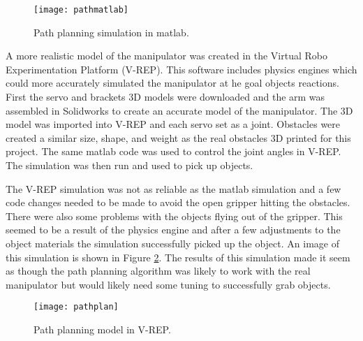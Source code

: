 \begin{figure}[h]
\centering
\texttt{[image: pathmatlab]}
\caption{Path planning simulation in matlab.}
\label{fig:pathmatlab}
\end{figure}

A more realistic model of the manipulator was created in the Virtual Robo Experimentation Platform (V-REP). This software includes physics engines which could more accurately simulated the manipulator at he goal objects reactions. First the servo and brackets 3D models were downloaded and the arm was assembled in Solidworks to create an accurate model of the manipulator. The 3D model was imported into V-REP and each servo set as a joint. Obstacles were created a similar size, shape, and weight as the real obstacles 3D printed for this project. The same matlab code was used to control the joint angles in V-REP. The simulation was then run and used to pick up objects. 

The V-REP simulation was not as reliable as the matlab simulation and a few code changes needed to be made to avoid the open gripper hitting the obstacles. There were also some problems with the objects flying out of the gripper. This seemed to  be a result of the physics engine and after a few adjustments to the object materials the simulation successfully picked up the object. An image of this simulation is shown in Figure \ref{fig:pathvrep}. The results of this simulation made it seem as though the path planning algorithm was likely to work with the real manipulator but would likely need some tuning to successfully grab objects. 

\begin{figure}
\centering
\texttt{[image: pathplan]}
\caption{Path planning model in V-REP.}
\label{fig:pathvrep}
\end{figure}